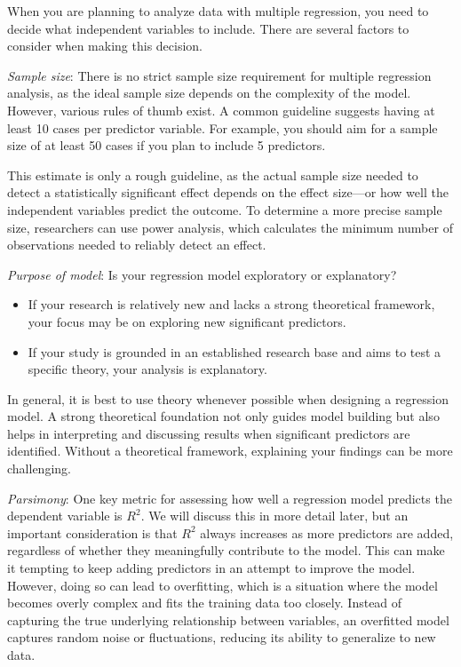 \documentclass[
  letterpaper,
  DIV=11,
  numbers=noendperiod]{scrreprt}
\begin{document}
When you are planning to analyze data with multiple regression, you need
to decide what independent variables to include. There are several
factors to consider when making this decision.\,\,

\emph{Sample size}: There is no strict sample size requirement for
multiple regression analysis, as the ideal sample size depends on the
complexity of the model. However, various rules of thumb exist. A common
guideline suggests having at least 10 cases per predictor variable. For
example, you should aim for a sample size of at least 50 cases if you
plan to include 5 predictors.

This estimate is only a rough guideline, as the actual sample size
needed to detect a statistically significant effect depends on the
effect size---or how well the independent variables predict the outcome.
To determine a more precise sample size, researchers can use power
analysis, which calculates the minimum number of observations needed to
reliably detect an effect.

\emph{Purpose of model}: Is your regression model exploratory or
explanatory?

\begin{itemize}
\item
  If your research is relatively new and lacks a strong theoretical
  framework, your focus may be on exploring new significant predictors.
\item
  If your study is grounded in an established research base and aims to
  test a specific theory, your analysis is explanatory.
\end{itemize}

In general, it is best to use theory whenever possible when designing a
regression model. A strong theoretical foundation not only guides model
building but also helps in interpreting and discussing results when
significant predictors are identified. Without a theoretical framework,
explaining your findings can be more challenging.

\emph{Parsimony}: One key metric for assessing how well a regression
model predicts the dependent variable is \(R^2\). We will discuss this
in more detail later, but an important consideration is that \(R^2\)
always increases as more predictors are added, regardless of whether
they meaningfully contribute to the model. This can make it tempting to
keep adding predictors in an attempt to improve the model. However,
doing so can lead to overfitting, which is a situation where the model
becomes overly complex and fits the training data too closely. Instead
of capturing the true underlying relationship between variables, an
overfitted model captures random noise or fluctuations, reducing its
ability to generalize to new data.
\end{document}
